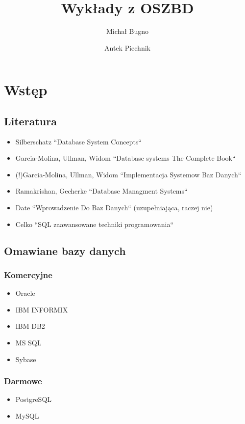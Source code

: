 \documentclass[12pt]{article}
\author{Michał Bugno \and Antek Piechnik}
\title{Wykłady z OSZBD}
\begin{document}
\maketitle
\tableofcontents
\newpage

\section{Wstęp}
\subsection{Literatura}
\begin{itemize}
\item Silberschatz ``Database System Concepts``
\item Garcia-Molina, Ullman, Widom ``Database systems The Complete Book``
\item (!)Garcia-Molina, Ullman, Widom ``Implementacja Systemow Baz Danych``
\item Ramakrishan, Gecherke ``Database Managment Systems``
\item Date ``Wprowadzenie Do Baz Danych`` (uzupełniająca, raczej nie)
\item Celko ``SQL zaawansowane techniki programowania``
\end{itemize}

\subsection{Omawiane bazy danych}
\subsubsection{Komercyjne}
\begin{itemize}
\item Oracle
\item IBM INFORMIX
\item IBM DB2
\item MS SQL
\item Sybase
\end{itemize}

\subsubsection{Darmowe}
\begin{itemize}
\item PostgreSQL
\item MySQL
\end{itemize}
\end{document}
